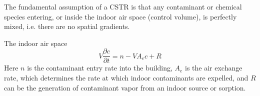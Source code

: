 The fundamental assumption of a CSTR is that any contaminant or chemical species entering, or inside the indoor air space (control volume), is perfectly mixed, i.e. there are no spatial gradients.

The indoor air space
\begin{equation}\label{eq:cst}
  V\frac{\partial c}{\partial t} = n - V A_e c + R
\end{equation}
Here $n$ is the contaminant entry rate into the building, $A_e$ is the air exchange rate, which determines the rate at which indoor contaminants are expelled, and $R$ can be the generation of contaminant vapor from an indoor source or sorption.
